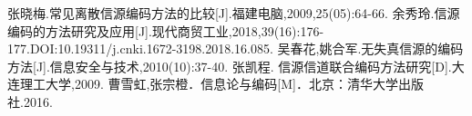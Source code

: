 \renewcommand{\baselinestretch}{\yuanbeishu} %
\normalsize{}                         %
\begin{multicols}{2} 
\begin{thebibliography}{9}                   %

	张晓梅.常见离散信源编码方法的比较[J].福建电脑,2009,25(05):64-66.
	余秀玲.信源编码的方法研究及应用[J].现代商贸工业,2018,39(16):176-177.DOI:10.19311/j.cnki.1672-3198.2018.16.085.
	吴春花,姚合军.无失真信源的编码方法[J].信息安全与技术,2010(10):37-40.
	张凯程. 信源信道联合编码方法研究[D].大连理工大学,2009.
	曹雪虹,张宗橙．信息论与编码[M]．北京：清华大学出版社.2016.

\end{thebibliography}
\end{multicols}
